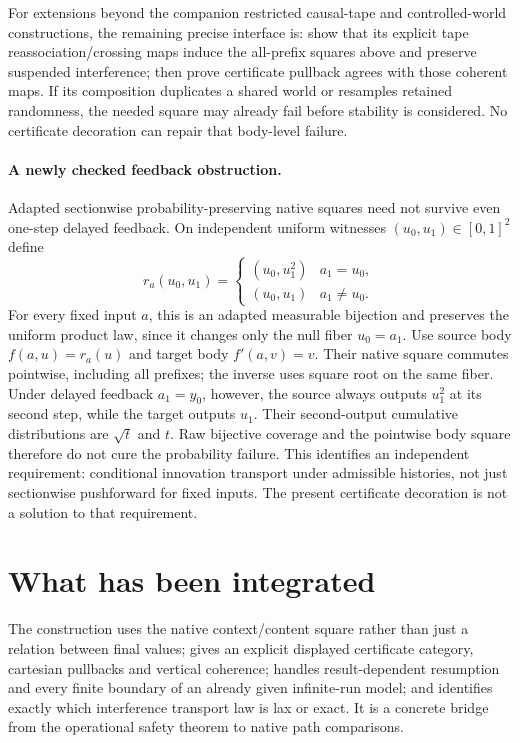 \documentclass[11pt]{article}
\begin{document}
For extensions beyond the companion restricted causal-tape and controlled-world constructions, the remaining precise interface is: show that its explicit tape reassociation/crossing maps induce the all-prefix squares above and preserve suspended interference; then prove certificate pullback agrees with those coherent maps. If its composition duplicates a shared world or resamples retained randomness, the needed square may already fail before stability is considered. No certificate decoration can repair that body-level failure.

\paragraph{A newly checked feedback obstruction.} Adapted sectionwise probability-preserving native squares need not survive even one-step delayed feedback. On independent uniform witnesses $(u_0,u_1)\in[0,1]^2$ define
\[
 r_a(u_0,u_1)=\begin{cases}(u_0,u_1^2)&a_1=u_0,\\(u_0,u_1)&a_1\ne u_0.\end{cases}
\]
For every fixed input $a$, this is an adapted measurable bijection and preserves the uniform product law, since it changes only the null fiber $u_0=a_1$. Use source body $f(a,u)=r_a(u)$ and target body $f'(a,v)=v$. Their native square commutes pointwise, including all prefixes; the inverse uses square root on the same fiber. Under delayed feedback $a_1=y_0$, however, the source always outputs $u_1^2$ at its second step, while the target outputs $u_1$. Their second-output cumulative distributions are $\sqrt t$ and $t$. Raw bijective coverage and the pointwise body square therefore do not cure the probability failure. This identifies an independent requirement: conditional innovation transport under admissible histories, not just sectionwise pushforward for fixed inputs. The present certificate decoration is not a solution to that requirement.

\section{What has been integrated}
The construction uses the native context/content square rather than just a relation between final values; gives an explicit displayed certificate category, cartesian pullbacks and vertical coherence; handles result-dependent resumption and every finite boundary of an already given infinite-run model; and identifies exactly which interference transport law is lax or exact. It is a concrete bridge from the operational safety theorem to native path comparisons.
\end{document}
